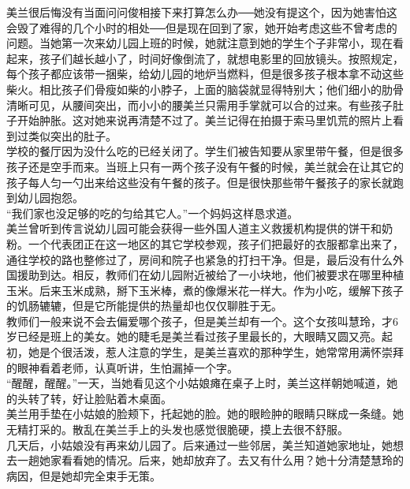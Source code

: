 \begin{multicols}{\theparacolNo}
美兰很后悔没有当面问问俊相接下来打算怎么办──她没有提这个，因为她害怕这会毁了难得的几个小时的相处──但是现在回到了家，她开始考虑这些不曾考虑的问题。当她第一次来幼儿园上班的时候，她就注意到她的学生个子非常小，现在看起来，孩子们越长越小了，时间好像倒流了，就想电影里的回放镜头。按照规定，每个孩子都应该带一捆柴，给幼儿园的地炉当燃料，但是很多孩子根本拿不动这些柴火。相比孩子们骨瘦如柴的小脖子，上面的脑袋就显得特别大；他们细小的肋骨清晰可见，从腰间突出，而小小的腰美兰只需用手掌就可以合的过来。有些孩子肚子开始肿胀。这对她来说再清楚不过了。美兰记得在拍摄于索马里饥荒的照片上看到过类似突出的肚子。\\

学校的餐厅因为没什么吃的已经关闭了。学生们被告知要从家里带午餐，但是很多孩子还是空手而来。当班上只有一两个孩子没有午餐的时候，美兰就会在让其它的孩子每人匀一勺出来给这些没有午餐的孩子。但是很快那些带午餐孩子的家长就跑到幼儿园抱怨。\\

“我们家也没足够的吃的匀给其它人。”一个妈妈这样恳求道。\\

美兰曾听到传言说幼儿园可能会获得一些外国人道主义救援机构提供的饼干和奶粉。一个代表团正在这一地区的其它学校参观，孩子们把最好的衣服都拿出来了，通往学校的路也整修过了，房间和院子也紧急的打扫干净。但是，最后没有什么外国援助到达。相反，教师们在幼儿园附近被给了一小块地，他们被要求在哪里种植玉米。后来玉米成熟，掰下玉米棒，煮的像爆米花一样大。作为小吃，缓解下孩子的饥肠辘辘，但是它所能提供的热量却也仅仅聊胜于无。\\

教师们一般来说不会去偏爱哪个孩子，但是美兰却有一个。这个女孩叫慧玲，才6岁已经是班上的美女。她的睫毛是美兰看过孩子里最长的，大眼睛又圆又亮。起初，她是个很活泼，惹人注意的学生，是美兰喜欢的那种学生，她常常用满怀崇拜的眼神看着老师，认真听讲，生怕漏掉一个字。\\

“醒醒，醒醒。”一天，当她看见这个小姑娘瘫在桌子上时，美兰这样朝她喊道，她的头转了转，好让脸贴着木桌面。\\

美兰用手垫在小姑娘的脸颊下，托起她的脸。她的眼睑肿的眼睛只眯成一条缝。她无精打采的。散乱在美兰手上的头发也感觉很脆硬，摸上去很不舒服。\\

几天后，小姑娘没有再来幼儿园了。后来通过一些邻居，美兰知道她家地址，她想去一趟她家看看她的情况。后来，她却放弃了。去又有什么用？她十分清楚慧玲的病因，但是她却完全束手无策。\\


\end{multicols}

